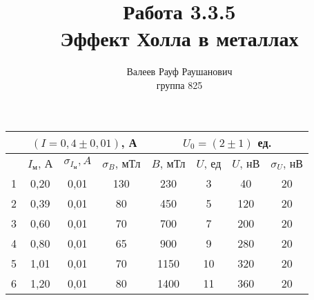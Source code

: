 \documentclass[a4paper, 12pt]{article}%
\author{Валеев Рауф Раушанович \\
группа 825}
\title{\textbf{Работа 3.3.5\\
Эффект Холла в металлах}}
\begin{document}
\begin{table}[]
\begin{tabular}{|c|c|c|c|c|c|c|c|}
\hline
 & \multicolumn{3}{c|}{$(I = 0,4 \pm 0,01)$, А} & \multicolumn{4}{c|}{$U_0 = (2 \pm 1)$ ед.} \\ \hline
 & $I_{\text{м}}$, А & $\sigma_{I_{\text{м}}}, A$ & $\sigma_B$, мТл & $B$, мТл & $U$, ед & $U$, нВ & $\sigma_{U}$, нВ \\ \hline
1 & 0,20 & 0,01 & 130 & 230 & 3 & 40 & 20 \\ \hline
2 & 0,39 & 0,01 & 80 & 450 & 5 & 120 & 20 \\ \hline
3 & 0,60 & 0,01 & 70 & 700 & 7 & 200 & 20 \\ \hline
4 & 0,80 & 0,01 & 65 & 900 & 9 & 280 & 20 \\ \hline
5 & 1,01 & 0,01 & 70 & 1150 & 10 & 320 & 20 \\ \hline
6 & 1,20 & 0,01 & 80 & 1400 & 11 & 360 & 20 \\ \hline
\end{tabular}
\end{table}
\end{document}
